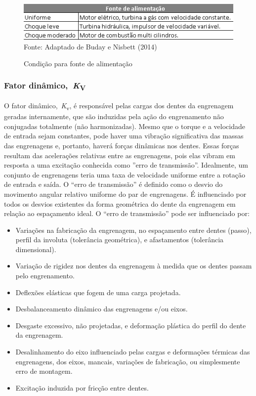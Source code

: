 \documentclass[12pt,a4paper]{article}
\providecommand{\tightlist}{\setlength{\itemsep}{0pt}\setlength{\parskip}{0pt}}%
\begin{document}
\begin{figure}[!htb]
    \centering
    \caption{Condição para fonte de alimentação}
    \includegraphics[scale=0.8]{Imagens/Img4.png}\\
    {\footnotesize Fonte: Adaptado de Buday e Nisbett (2014)}
    \label{fig:4}
\end{figure}

\subsubsection*{\texorpdfstring{Fator
dinâmico,~\emph{K}\textsubscript{V}}{Fator dinâmico,~KV}}

{\label{fator-dinuxe2mico-kv}}

O fator dinâmico,~\emph{K}\textsubscript{v}, é responsável pelas cargas
dos dentes da engrenagem geradas internamente, que são induzidas pela
ação do engrenamento não conjugadas totalmente (não harmonizadas). Mesmo
que o torque e a velocidade de entrada sejam constantes, pode haver uma
vibração significativa das massas das engrenagens e, portanto, haverá
forças dinâmicas nos dentes. Essas forças resultam das acelerações
relativas entre as engrenagens, pois elas vibram em resposta a uma
excitação conhecida como ''erro de transmissão''. Idealmente, um
conjunto de engrenagens teria uma taxa de velocidade uniforme entre a
rotação de entrada e saída. O ``erro de transmissão'' é definido como o
desvio do movimento angular relativo uniforme do par de engrenagens. É
influenciado por todos os desvios existentes da forma geométrica do
dente da engrenagem em relação ao espaçamento ideal. O ``erro de
transmissão'' pode ser influenciado por:

\begin{itemize}
\tightlist
\item
  Variações na fabricação da engrenagem, no espaçamento entre dentes
  (passo), perfil da involuta (tolerância geométrica), e afastamentos
  (tolerância dimensional).
\item
  Variação de rigidez nos dentes da engrenagem à medida que os dentes
  passam pelo engrenamento.
\item
  Deflexões elásticas que fogem de uma carga projetada.
\item
  Desbalanceamento dinâmico das engrenagens e/ou eixos.
\item
  Desgaste excessivo, não projetadas, e deformação plástica do perfil do
  dente da engrenagem.
\item
  Desalinhamento do eixo influenciado pelas cargas e deformações
  térmicas das engrenagens, dos eixos, mancais, variações de fabricação,
  ou simplesmente erro de montagem.
\item
  Excitação induzida por fricção entre dentes.
\end{itemize}
\end{document}
